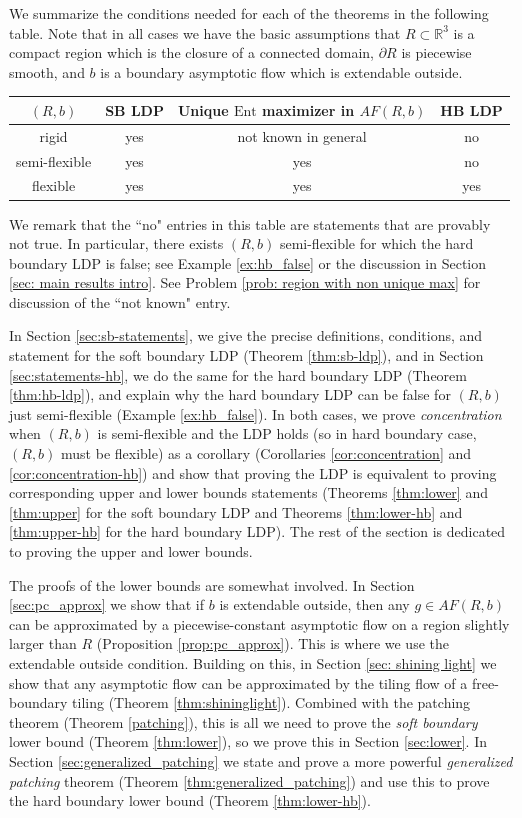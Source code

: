 \documentclass[11pt]{article}
\theoremstyle{remark}
\theoremstyle{definition}
\newcommand{\Ent}{\text{Ent}}
\newcommand{\m}[1]{\mathbb{#1}}
\begin{document}
We summarize the conditions needed for each of the theorems in the following table. Note that in all cases we have the basic assumptions that $R\subset \m R^3$ is a compact region which is the closure of a connected domain, $\partial R$ is piecewise smooth, and $b$ is a boundary asymptotic flow which is extendable outside. 

\begin{center} \begin{tabular}{|c|c|c|c|}
    \hline
     $(R,b)$ & SB LDP & Unique $\Ent$ maximizer in $AF(R,b)$ & HB LDP\\
\hline
rigid & {yes} & {not known in general} & {no} \\
\hline
semi-flexible & {yes} & {yes} & {no}\\
\hline
flexible & {yes} & {yes} & {yes}\\
\hline
\end{tabular}
\end{center}
We remark that the ``no" entries in this table are statements that are provably not true. In particular, there exists $(R,b)$ semi-flexible for which the hard boundary LDP is false; see Example \ref{ex:hb_false} or the discussion in Section \ref{sec: main results intro}. See Problem \ref{prob: region with non unique max} for discussion of the ``not known" entry.

In Section \ref{sec:sb-statements}, we give the precise definitions, conditions, and statement for the soft boundary LDP (Theorem \ref{thm:sb-ldp}), and in Section \ref{sec:statements-hb}, we do the same for the hard boundary LDP (Theorem \ref{thm:hb-ldp}), and explain why the hard boundary LDP can be false for $(R,b)$ just semi-flexible (Example \ref{ex:hb_false}). In both cases, we prove \textit{concentration} when $(R,b)$ is semi-flexible and the LDP holds (so in hard boundary case, $(R,b)$ must be flexible) as a corollary (Corollaries \ref{cor:concentration} and \ref{cor:concentration-hb}) and show that proving the LDP is equivalent to proving corresponding upper and lower bounds statements (Theorems \ref{thm:lower} and \ref{thm:upper} for the soft boundary LDP and Theorems \ref{thm:lower-hb} and \ref{thm:upper-hb} for the hard boundary LDP). The rest of the section is dedicated to proving the upper and lower bounds.

The proofs of the lower bounds are somewhat involved. In Section \ref{sec:pc_approx} we show that if $b$ is extendable outside, then any $g\in AF(R,b)$ can be approximated by a piecewise-constant asymptotic flow on a region slightly larger than $R$ (Proposition \ref{prop:pc_approx}). This is where we use the extendable outside condition. Building on this, in Section \ref{sec: shining light} we show that any asymptotic flow can be approximated by the tiling flow of a free-boundary tiling (Theorem \ref{thm:shininglight}). Combined with the patching theorem (Theorem \ref{patching}), this is all we need to prove the \textit{soft boundary} lower bound (Theorem \ref{thm:lower}), so we prove this in Section \ref{sec:lower}. In Section \ref{sec:generalized_patching} we state and prove a more powerful \textit{generalized patching} theorem (Theorem \ref{thm:generalized_patching}) and use this to prove the hard boundary lower bound (Theorem \ref{thm:lower-hb}). 
\end{document}
